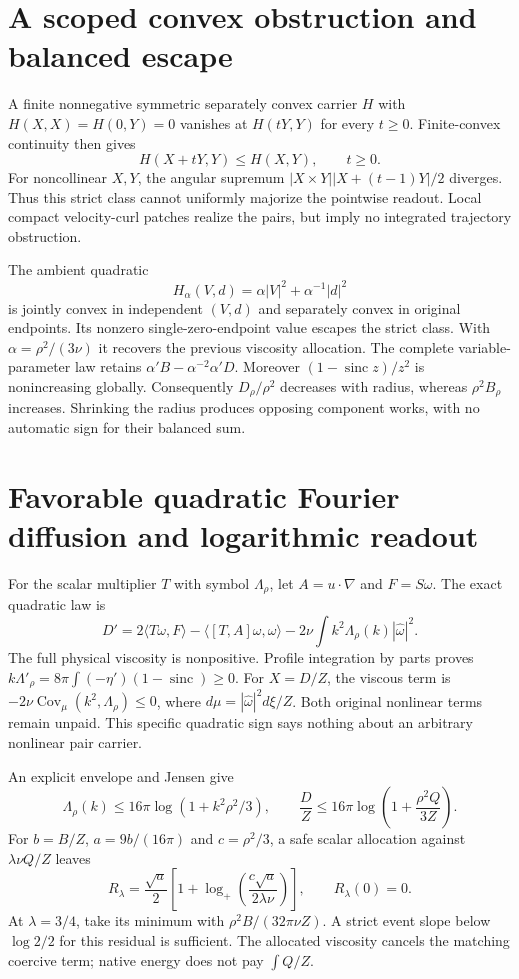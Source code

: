 \documentclass[11pt]{article}
\begin{document}
\section{A scoped convex obstruction and balanced escape}
A finite nonnegative symmetric separately convex carrier $H$ with
$H(X,X)=H(0,Y)=0$ vanishes at $H(tY,Y)$ for every $t\ge0$.
Finite-convex continuity then gives
\[
 H(X+tY,Y)\le H(X,Y),\qquad t\ge0.
\]
For noncollinear $X,Y$, the angular supremum
$|X\times Y||X+(t-1)Y|/2$ diverges. Thus this strict class cannot
uniformly majorize the pointwise readout. Local compact velocity-curl
patches realize the pairs, but imply no integrated trajectory obstruction.

The ambient quadratic
\[
 H_\alpha(V,d)=\alpha|V|^2+\alpha^{-1}|d|^2
\]
is jointly convex in independent $(V,d)$ and separately convex in
original endpoints. Its nonzero single-zero-endpoint value escapes the
strict class. With $\alpha=\rho^2/(3\nu)$ it recovers the previous
viscosity allocation. The complete variable-parameter law retains
$\alpha'B-\alpha^{-2}\alpha'D$.
Moreover $(1-\operatorname{sinc}z)/z^2$ is nonincreasing globally.
Consequently $D_\rho/\rho^2$ decreases with radius, whereas
$\rho^2B_\rho$ increases. Shrinking the radius produces opposing
component works, with no automatic sign for their balanced sum.

\section{Favorable quadratic Fourier diffusion and logarithmic readout}
For the scalar multiplier $T$ with symbol $\Lambda_\rho$, let
$A=u\cdot\nabla$ and $F=S\omega$. The exact quadratic law is
\[
 D'=2\langle T\omega,F\rangle
   -\langle[T,A]\omega,\omega\rangle
   -2\nu\int k^2\Lambda_\rho(k)|\widehat\omega|^2.
\]
The full physical viscosity is nonpositive. Profile integration by
parts proves $k\Lambda'_\rho=8\pi\int(-\eta')(1-\operatorname{sinc})
\ge0$. For $X=D/Z$, the viscous term is
$-2\nu\operatorname{Cov}_{\mu}(k^2,\Lambda_\rho)\le0$,
where $d\mu=|\widehat\omega|^2d\xi/Z$. Both original nonlinear
terms remain unpaid. This specific quadratic sign says nothing about
an arbitrary nonlinear pair carrier.

An explicit envelope and Jensen give
\[
 \Lambda_\rho(k)\le16\pi\log(1+k^2\rho^2/3),\qquad
 \frac DZ\le16\pi\log\left(1+\frac{\rho^2Q}{3Z}\right).
\]
For $b=B/Z$, $a=9b/(16\pi)$ and $c=\rho^2/3$, a safe scalar
allocation against $\lambda\nu Q/Z$ leaves
\[
 R_\lambda=\frac{\sqrt a}{2}
 \left[1+\log_+\left(\frac{c\sqrt a}{2\lambda\nu}\right)\right],
 \qquad R_\lambda(0)=0.
\]
At $\lambda=3/4$, take its minimum with
$\rho^2B/(32\pi\nu Z)$. A strict event slope below $\log2/2$
for this residual is sufficient. The allocated viscosity cancels the
matching coercive term; native energy does not pay $\int Q/Z$.
\end{document}
